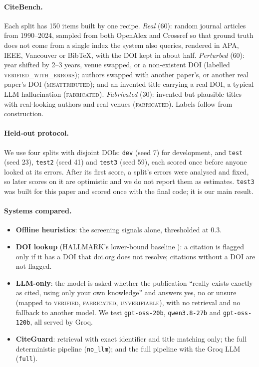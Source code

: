 \documentclass[10pt,twocolumn,a4paper]{article}
\newcommand{\verdict}[1]{\textsc{\MakeLowercase{#1}}}
\newcommand{\cg}{CiteGuard}
\begin{document}
\paragraph{CiteBench.}
Each split has 150 items built by one recipe. \emph{Real} (60): random journal articles from
1990--2024, sampled from both OpenAlex and Crossref so that ground truth does not come from a
single index the system also queries, rendered in APA, IEEE, Vancouver or BibTeX, with the DOI kept
in about half. \emph{Perturbed} (60): year shifted by 2--3 years, venue swapped, or a non-existent DOI
(labelled \verdict{VERIFIED\_WITH\_ERRORS}); authors swapped with another paper's, or another real
paper's DOI (\verdict{MISATTRIBUTED}); and an invented title carrying a real DOI, a typical LLM
hallucination (\verdict{FABRICATED}). \emph{Fabricated} (30): invented but plausible titles with
real-looking authors and real venues (\verdict{FABRICATED}). Labels follow from construction.

\paragraph{Held-out protocol.}
We use four splits with disjoint DOIs: \texttt{dev} (seed 7) for development, and \texttt{test}
(seed 23), \texttt{test2} (seed 41) and \texttt{test3} (seed 59), each scored once before anyone looked
at its errors. After its first score, a split's errors were analysed and fixed, so later scores on it
are optimistic and we do not report them as estimates. \texttt{test3} was built for this paper and
scored once with the final code; it is our main result.

\paragraph{Systems compared.}
\begin{itemize}
  \item \textbf{Offline heuristics}: the screening signals alone, thresholded at 0.3.
  \item \textbf{DOI lookup} (HALLMARK's lower-bound baseline \citep{kim2026hallmark}): a citation
  is flagged only if it has a DOI that doi.org does not resolve; citations without a DOI are not
  flagged.
  \item \textbf{LLM-only}: the model is asked whether the publication ``really exists exactly as
  cited, using only your own knowledge'' and answers yes, no or unsure (mapped to
  \verdict{VERIFIED}, \verdict{FABRICATED}, \verdict{UNVERIFIABLE}), with no retrieval and no fallback
  to another model. We test \texttt{gpt-oss-20b}, \texttt{qwen3.8-27b} and \texttt{gpt-oss-120b}, all
  served by Groq.
  \item \textbf{\cg{}}: retrieval with exact identifier and title matching only; the full
  deterministic pipeline (\texttt{no\_llm}); and the full pipeline with the Groq LLM (\texttt{full}).
\end{itemize}
\end{document}
